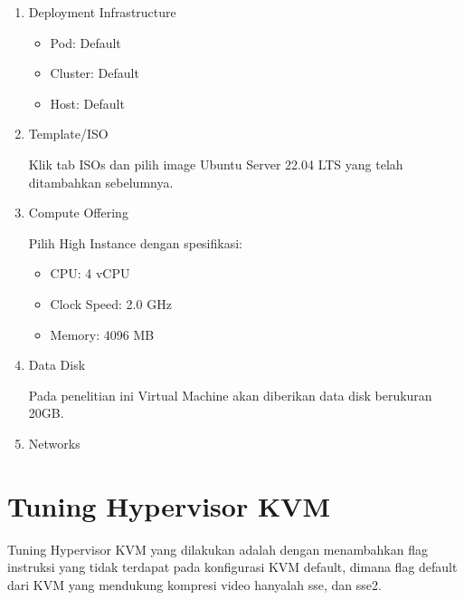 \begin{enumerate}
    \item Deployment Infrastructure
    \begin{itemize}
        \item Pod: Default
        \item Cluster: Default
        \item Host: Default
    \end{itemize}

    \item Template/ISO
    
    Klik tab ISOs dan pilih image Ubuntu Server 22.04 LTS yang telah ditambahkan sebelumnya.

    \item Compute Offering
    
    Pilih High Instance dengan spesifikasi:
    \begin{itemize}
        \item CPU: 4 vCPU
        \item Clock Speed: 2.0 GHz
        \item Memory: 4096 MB
    \end{itemize}

    \item Data Disk
    
    Pada penelitian ini Virtual Machine akan diberikan data disk berukuran 20GB.

    \item Networks
\end{enumerate}

\section{Tuning Hypervisor KVM}
Tuning Hypervisor KVM yang dilakukan adalah dengan menambahkan flag instruksi yang tidak terdapat pada konfigurasi KVM default, dimana flag default dari KVM yang mendukung kompresi video hanyalah sse, dan sse2.

